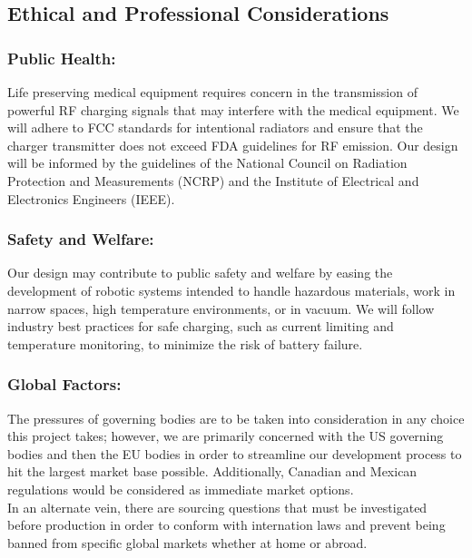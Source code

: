 \documentclass[12pt]{article}
\begin{document}
\pagebreak

 
\subsection{Ethical and Professional Considerations}

\subsubsection{Public Health:}
Life preserving medical equipment requires concern in the transmission of powerful RF charging signals that may interfere with the medical equipment. We will adhere to FCC standards for intentional radiators and ensure that the charger transmitter does not exceed FDA guidelines for RF emission. Our design will be informed by the guidelines of the National Council on Radiation Protection and Measurements (NCRP) and the Institute of Electrical and Electronics Engineers (IEEE).
 
\subsubsection{Safety and Welfare:}
Our design may contribute to public safety and welfare by easing the development of robotic systems intended to handle hazardous materials, work in narrow spaces, high temperature environments, or in vacuum. We will follow industry best practices for safe charging, such as current limiting and temperature monitoring, to minimize the risk of battery failure.

\subsubsection{Global Factors:}
The pressures of governing bodies are to be taken into consideration in any choice this project takes; however, we are primarily concerned with the US governing bodies and then the EU bodies in order to streamline our development process to hit the largest market base possible.  Additionally, Canadian and Mexican regulations would be considered as immediate market options.\\
In an alternate vein, there are sourcing questions that must be investigated before production in order to conform with internation laws and prevent being banned from specific global markets whether at home or abroad.
\end{document}
